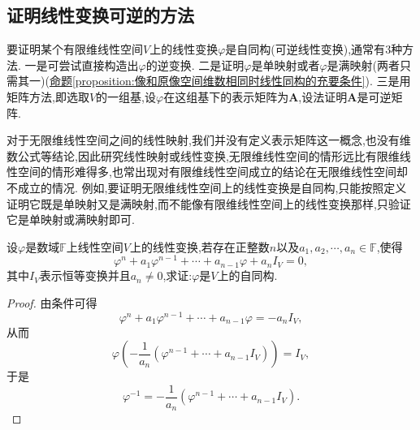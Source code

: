 \documentclass[../../main.tex]{subfiles}%
\begin{document}
\subsection{证明线性变换可逆的方法}

要证明某个有限维线性空间\(V\)上的线性变换\(\varphi\)是自同构(可逆线性变换),通常有\(3\)种方法. 一是可尝试直接构造出\(\varphi\)的逆变换. 二是证明\(\varphi\)是单映射或者\(\varphi\)是满映射(两者只需其一)(\hyperref[proposition:像和原像空间维数相同时线性同构的充要条件]{命题\ref{proposition:像和原像空间维数相同时线性同构的充要条件}}). 三是用矩阵方法,即选取\(V\)的一组基,设\(\varphi\)在这组基下的表示矩阵为\(\boldsymbol{A}\),设法证明\(\boldsymbol{A}\)是可逆矩阵. 

对于无限维线性空间之间的线性映射,我们并没有定义表示矩阵这一概念,也没有维数公式等结论,因此研究线性映射或线性变换,无限维线性空间的情形远比有限维线性空间的情形难得多,也常出现对有限维线性空间成立的结论在无限维线性空间却不成立的情况. 例如,要证明无限维线性空间上的线性变换是自同构,只能按照定义证明它既是单映射又是满映射,而不能像有限维线性空间上的线性变换那样,只验证它是单映射或满映射即可.
\begin{example}
设\(\varphi\)是数域\(\mathbb{F}\)上线性空间\(V\)上的线性变换,若存在正整数\(n\)以及\(a_1,a_2,\cdots,a_n\in\mathbb{F}\),使得
\[
\varphi^{n}+a_1\varphi^{n - 1}+\cdots+a_{n - 1}\varphi+a_nI_V = 0,
\]
其中\(I_V\)表示恒等变换并且\(a_n\neq 0\),求证:\(\varphi\)是\(V\)上的自同构.
\end{example}
\begin{proof}
由条件可得
\[
\varphi^{n}+a_1\varphi^{n - 1}+\cdots+a_{n - 1}\varphi=-a_nI_V,
\]
从而
\[
\varphi\left(-\frac{1}{a_n}(\varphi^{n - 1}+\cdots+a_{n - 1}I_V)\right)=I_V,
\]
于是
\[
\varphi^{-1}=-\frac{1}{a_n}(\varphi^{n - 1}+\cdots+a_{n - 1}I_V). 
\]
\end{proof}
\end{document}

